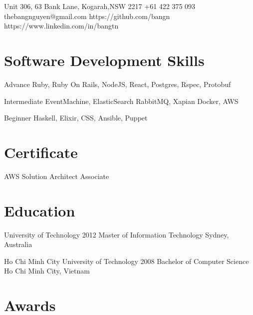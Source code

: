 \documentclass{tccv}
\begin{document}
\personal
    {Unit 306, 63 Bank Lane, Kogarah,\newline NSW 2217}
    {+61 422 375 093}
    {thebangnguyen@gmail.com}
    {https://github.com/bangn}
    {https://www.linkedin.com/in/bangtn}

\section{Software Development Skills}

\begin{factlist}

\item{Advance}
    {Ruby, Ruby On Rails, NodeJS, React, Postgres, Rspec, Protobuf}

\item{Intermediate}
    {EventMachine, ElasticSearch
    \newline RabbitMQ, Xapian
    \newline Docker, AWS}

\item{Beginner}
    {Haskell, Elixir, CSS, Ansible, Puppet}
\end{factlist}

\section{Certificate}

\begin{factlist}

\item{AWS Solution Architect}
    {Associate}

\end{factlist}

\section{Education}
\begin{yearlist}

\item[University of Technology]{2012}
    {Master of Information Technology}
    {Sydney, Australia}

\item[Ho Chi Minh City University of Technology]{2008}
    {Bachelor of Computer Science}
    {Ho Chi Minh City, Vietnam}

\end{yearlist}

\section{Awards}
\end{document}
